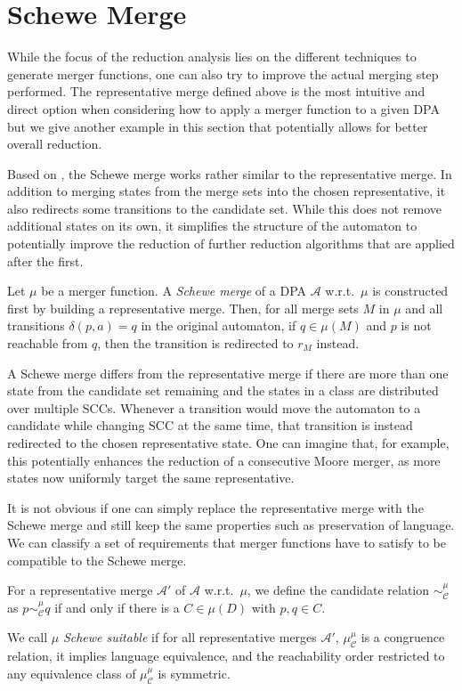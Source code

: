 \section{Schewe Merge}
While the focus of the reduction analysis lies on the different techniques to generate merger functions, one can also try to improve the actual merging step performed. The representative merge defined above is the most intuitive and direct option when considering how to apply a merger function to a given DPA but we give another example in this section that potentially allows for better overall reduction.

Based on \cite{Schewe2010}, the Schewe merge works rather similar to the representative merge. In addition to merging states from the merge sets into the chosen representative, it also redirects some transitions to the candidate set. While this does not remove additional states on its own, it simplifies the structure of the automaton to potentially improve the reduction of further reduction algorithms that are applied after the first.

\begin{definition}
	Let $\mu$ be a merger function. A \emph{Schewe merge} of a DPA $\mathcal{A}$ w.r.t.\ $\mu$ is constructed first by building a representative merge. Then, for all merge sets $M$ in $\mu$ and all transitions $\delta(p, a) = q$ in the original automaton, if $q \in \mu(M)$ and $p$ is not reachable from $q$, then the transition is redirected to $r_M$ instead.
\end{definition}

A Schewe merge differs from the representative merge if there are more than one state from the candidate set remaining and the states in a class are distributed over multiple SCCs. Whenever a transition would move the automaton to a candidate while changing SCC at the same time, that transition is instead redirected to the chosen representative state. 
One can imagine that, for example, this potentially enhances the reduction of a consecutive Moore merger, as more states now uniformly target the same representative.

It is not obvious if one can simply replace the representative merge with the Schewe merge and still keep the same properties such as preservation of language.
We can classify a set of requirements that merger functions have to satisfy to be compatible to the Schewe merge.

\begin{definition}
	For a representative merge $\mathcal{A}'$ of $\mathcal{A}$ w.r.t.\ $\mu$, we define the candidate relation $\sim_\mathcal{C}^\mu$ as $p \sim_\mathcal{C}^\mu q$ if and only if there is a $C \in \mu(D)$ with $p, q \in C$.
	
	We call $\mu$ \emph{Schewe suitable} if for all representative merges $\mathcal{A}'$, $\mu_\mathcal{C}^\mu$ is a congruence relation, it implies language equivalence, and the reachability order restricted to any equivalence class of $\mu_\mathcal{C}^\mu$ is symmetric.
\end{definition}

